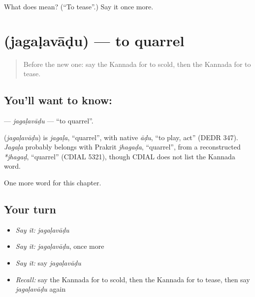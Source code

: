 \begin{tcolorbox}[breakable,colback=teal!4,colframe=teal!35!black,title={Before you move on}]
What does  mean? (\textquotedblleft{}To tease\textquotedblright{}.) Say it once more.
\end{tcolorbox}
\section[\texorpdfstring{\kn{ಜಗಳವಾಡು} (jagaḷavāḍu)}{ಜಗಳವಾಡು (jagaḷavāḍu)}]{ (jagaḷavāḍu) — to quarrel}

\label{lesson:KA-C276-jagalavadu}



\begin{quote}
Before the new one: say the Kannada for to scold, then the Kannada for to tease.
\end{quote}

\subsection*{You'll want to know: }
\textbf{} — \emph{jagaḷavāḍu} — \textquotedblleft{}to quarrel\textquotedblright{}.

\begin{cousinweb}
\textbf{} (\emph{jagaḷavāḍu}) is \emph{jagaḷa}, \textquotedblleft{}quarrel\textquotedblright{}, with native \emph{āḍu}, \textquotedblleft{}to play, act\textquotedblright{} (DEDR 347). \emph{Jagaḷa} probably belongs with Prakrit \emph{jhagaḍa}, \textquotedblleft{}quarrel\textquotedblright{}, from a reconstructed \emph{*jhagaḍ}, \textquotedblleft{}quarrel\textquotedblright{} (CDIAL 5321), though CDIAL does not list the Kannada word.
\end{cousinweb}

\begin{grammarlens}[title={What you've built}]
One more word for this chapter.
\end{grammarlens}

\subsection*{Your turn}
\begin{itemize}
\raggedright
  \item \emph{Say it:} \emph{jagaḷavāḍu}
  \item \emph{Say it:} \emph{jagaḷavāḍu}, once more
  \item \emph{Say it:} say \emph{jagaḷavāḍu}
  \item \emph{Recall:} say the Kannada for to scold, then the Kannada for to tease, then say \emph{jagaḷavāḍu} again
\end{itemize}

